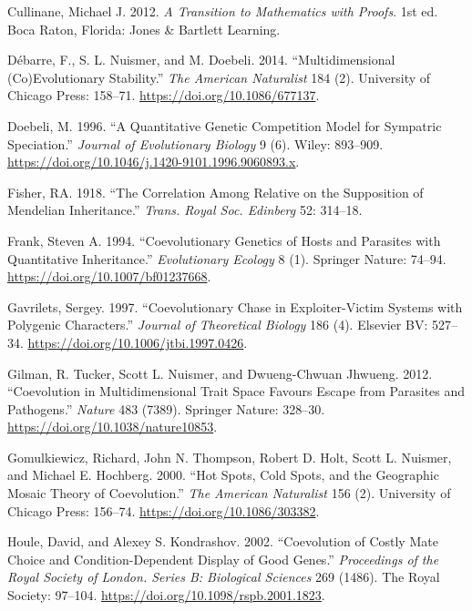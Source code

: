\documentclass[]{article}
\begin{document}
\leavevmode\hypertarget{ref-cull2012}{}%
Cullinane, Michael J. 2012. \emph{A Transition to Mathematics with
Proofs}. 1st ed. Boca Raton, Florida: Jones \& Bartlett Learning.

\leavevmode\hypertarget{ref-Dbarre2014}{}%
Débarre, F., S. L. Nuismer, and M. Doebeli. 2014. ``Multidimensional
(Co)Evolutionary Stability.'' \emph{The American Naturalist} 184 (2).
University of Chicago Press: 158--71.
\url{https://doi.org/10.1086/677137}.

\leavevmode\hypertarget{ref-Doebeli1996}{}%
Doebeli, M. 1996. ``A Quantitative Genetic Competition Model for
Sympatric Speciation.'' \emph{Journal of Evolutionary Biology} 9 (6).
Wiley: 893--909.
\url{https://doi.org/10.1046/j.1420-9101.1996.9060893.x}.

\leavevmode\hypertarget{ref-fisher1918correlation}{}%
Fisher, RA. 1918. ``The Correlation Among Relative on the Supposition of
Mendelian Inheritance.'' \emph{Trans. Royal Soc. Edinberg} 52: 314--18.

\leavevmode\hypertarget{ref-Frank1994}{}%
Frank, Steven A. 1994. ``Coevolutionary Genetics of Hosts and Parasites
with Quantitative Inheritance.'' \emph{Evolutionary Ecology} 8 (1).
Springer Nature: 74--94. \url{https://doi.org/10.1007/bf01237668}.

\leavevmode\hypertarget{ref-Gavrilets1997}{}%
Gavrilets, Sergey. 1997. ``Coevolutionary Chase in Exploiter-Victim
Systems with Polygenic Characters.'' \emph{Journal of Theoretical
Biology} 186 (4). Elsevier BV: 527--34.
\url{https://doi.org/10.1006/jtbi.1997.0426}.

\leavevmode\hypertarget{ref-Gilman2012}{}%
Gilman, R. Tucker, Scott L. Nuismer, and Dwueng-Chwuan Jhwueng. 2012.
``Coevolution in Multidimensional Trait Space Favours Escape from
Parasites and Pathogens.'' \emph{Nature} 483 (7389). Springer Nature:
328--30. \url{https://doi.org/10.1038/nature10853}.

\leavevmode\hypertarget{ref-Gomulkiewicz2000}{}%
Gomulkiewicz, Richard, John N. Thompson, Robert D. Holt, Scott L.
Nuismer, and Michael E. Hochberg. 2000. ``Hot Spots, Cold Spots, and the
Geographic Mosaic Theory of Coevolution.'' \emph{The American
Naturalist} 156 (2). University of Chicago Press: 156--74.
\url{https://doi.org/10.1086/303382}.

\leavevmode\hypertarget{ref-Houle2002}{}%
Houle, David, and Alexey S. Kondrashov. 2002. ``Coevolution of Costly
Mate Choice and Condition-Dependent Display of Good Genes.''
\emph{Proceedings of the Royal Society of London. Series B: Biological
Sciences} 269 (1486). The Royal Society: 97--104.
\url{https://doi.org/10.1098/rspb.2001.1823}.
\end{document}
